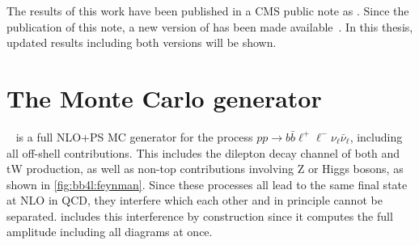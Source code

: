 The results of this work have been published in a CMS public note as . Since the publication of this note, a new version of \bbfourl has been made available~\cite{Jezo:2023rht}. In this thesis, updated results including both versions will be shown.

\section{The Monte Carlo generator \texorpdfstring{\bbfourl}{bb4l}}
\label{sec:bb4l:bb4l}

\bbfourl ~\cite{Jezo:2016ujg,Jezo:2023rht} is a full NLO+PS MC generator for the process $pp \to b \bar{b} \ell^+ \ell^- \nu_\ell \bar{\nu}_\ell$, including all off-shell contributions. This includes the dilepton decay channel of both \ttbar and tW production, as well as non-top contributions involving Z or Higgs bosons, as shown in \cref{fig:bb4l:feynman}. Since these processes all lead to the same final state at NLO in QCD, they interfere which each other and in principle cannot be separated. \bbfourl includes this interference by construction since it computes the full amplitude including all diagrams at once.

